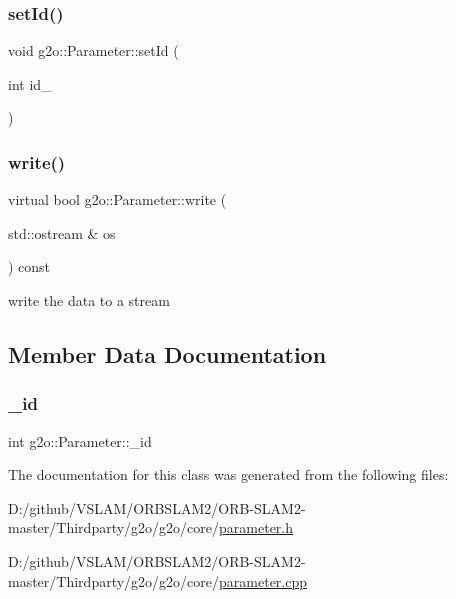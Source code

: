 \mbox{\label{classg2o_1_1_parameter_a2872398ab7d8c95d0a1b5ca5bbfae461}} 
\subsubsection{\texorpdfstring{set\+Id()}{setId()}}
{\footnotesize\ttfamily void g2o\+::\+Parameter\+::set\+Id (\begin{DoxyParamCaption}\item[{int}]{id\+\_\+ }\end{DoxyParamCaption})}

\mbox{\label{classg2o_1_1_parameter_a18e66a40cd71a4da2ab9be5ba318abb7}} 
\subsubsection{\texorpdfstring{write()}{write()}}
{\footnotesize\ttfamily virtual bool g2o\+::\+Parameter\+::write (\begin{DoxyParamCaption}\item[{std\+::ostream \&}]{os }\end{DoxyParamCaption}) const\hspace{0.3cm}{\ttfamily [pure virtual]}}



write the data to a stream 



\subsection{Member Data Documentation}
\mbox{\label{classg2o_1_1_parameter_a602d08079c6a3a5f868e41a102e1db0b}} 
\subsubsection{\texorpdfstring{\+\_\+id}{\_id}}
{\footnotesize\ttfamily int g2o\+::\+Parameter\+::\+\_\+id\hspace{0.3cm}{\ttfamily [protected]}}



The documentation for this class was generated from the following files\+:\begin{DoxyCompactItemize}
\item 
D\+:/github/\+V\+S\+L\+A\+M/\+O\+R\+B\+S\+L\+A\+M2/\+O\+R\+B-\/\+S\+L\+A\+M2-\/master/\+Thirdparty/g2o/g2o/core/\mbox{\hyperlink{parameter_8h}{parameter.\+h}}\item 
D\+:/github/\+V\+S\+L\+A\+M/\+O\+R\+B\+S\+L\+A\+M2/\+O\+R\+B-\/\+S\+L\+A\+M2-\/master/\+Thirdparty/g2o/g2o/core/\mbox{\hyperlink{parameter_8cpp}{parameter.\+cpp}}\end{DoxyCompactItemize}

